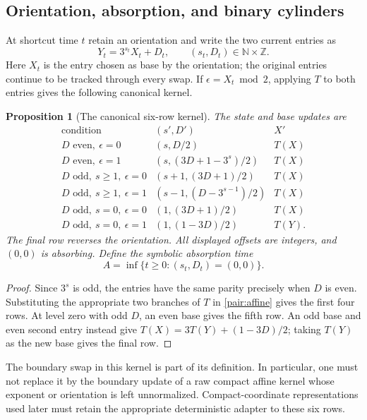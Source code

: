 \documentclass[11pt]{amsart}
\newtheorem{proposition}[theorem]{Proposition}
\theoremstyle{definition}
\theoremstyle{remark}
\newcommand{\N}{\mathbb N}
\newcommand{\Z}{\mathbb Z}
\begin{document}
\subsection{Orientation, absorption, and binary cylinders}

At shortcut time $t$ retain an orientation and write the two current entries as
\begin{equation}\label{pair:affine}
 Y_t=3^{s_t}X_t+D_t,\qquad (s_t,D_t)\in\N\times\Z.
\end{equation}
Here $X_t$ is the entry chosen as base by the orientation; the original entries
continue to be tracked through every swap.  If $\epsilon=X_t\bmod2$, applying
$T$ to both entries gives the following canonical kernel.

\begin{proposition}[The canonical six-row kernel]\label{pair:kernel}
The state and base updates are
\[
\begin{array}{c|c|c}
\text{condition}&(s',D')&X'\\\hline
D\text{ even},\ \epsilon=0&(s,D/2)&T(X)\\
D\text{ even},\ \epsilon=1&(s,(3D+1-3^s)/2)&T(X)\\
D\text{ odd},\ s\ge1,\ \epsilon=0&(s+1,(3D+1)/2)&T(X)\\
D\text{ odd},\ s\ge1,\ \epsilon=1&(s-1,(D-3^{s-1})/2)&T(X)\\
D\text{ odd},\ s=0,\ \epsilon=0&(1,(3D+1)/2)&T(X)\\
D\text{ odd},\ s=0,\ \epsilon=1&(1,(1-3D)/2)&T(Y).
\end{array}
\]
The final row reverses the orientation.  All displayed offsets are integers,
and $(0,0)$ is absorbing.  Define the symbolic absorption time
\[
 A=\inf\{t\ge0:(s_t,D_t)=(0,0)\}.
\]
\end{proposition}
\begin{proof}
Since $3^s$ is odd, the entries have the same parity precisely when $D$ is
even.  Substituting the appropriate two branches of $T$ in
\eqref{pair:affine} gives the first four rows.  At level zero with odd $D$, an
even base gives the fifth row.  An odd base and even second entry instead give
$T(X)=3T(Y)+(1-3D)/2$; taking $T(Y)$ as the new base gives the final row.
\end{proof}

The boundary swap in this kernel is part of its definition.  In particular,
one must not replace it by the boundary update of a raw compact affine kernel
whose exponent or orientation is left unnormalized.  Compact-coordinate
representations used later must retain the appropriate deterministic adapter
to these six rows.
\end{document}
